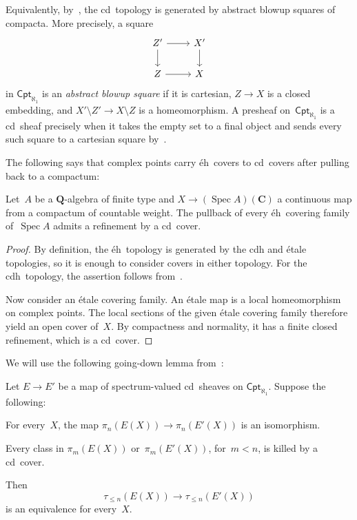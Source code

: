 \documentclass[11pt,a4paper]{amsart}
\numberwithin{equation}{section}
\theoremstyle{plain}
\theoremstyle{definition}
\theoremstyle{remark}
\newcommand{\QQ}{\mathbf{Q}}
\newcommand{\CC}{\mathbf{C}}
\newcommand{\Spec}{\operatorname{Spec}}
\newcommand{\Cat}[1]{\mathsf{#1}}
\begin{document}
Equivalently, by~\cite[Lemma~3.10]{k-ros-1},
the cd~topology is generated
by abstract blowup squares
of compacta.
More precisely, a square
\begin{equation*}
  \begin{tikzcd}
    Z'\ar[d]\ar[r]&
    X'\ar[d]\\
    Z\ar[r]&
    X
  \end{tikzcd}
\end{equation*}
in \(\Cat{Cpt}_{\aleph_1}\)
is an \emph{abstract blowup square} if it is cartesian,
\(Z\to X\) is a closed embedding, and
\(X'\setminus Z'\to X\setminus Z\) is a homeomorphism.
A presheaf on~\(\Cat{Cpt}_{\aleph_1}\)
is a cd~sheaf precisely
when it takes the empty set to a final object
and sends every such square to a cartesian square
by~\cite[Theorem~3.9]{k-ros-1}.

The following says that complex points carry éh~covers
to cd~covers
after pulling back to a compactum:

\begin{lemma}\label{covers}
  Let~\(A\) be a \(\QQ\)-algebra of finite type
  and \(X\to(\Spec A)(\CC)\) a continuous map
  from a compactum of countable weight.
  The pullback of every éh~covering family of~\(\Spec A\)
  admits a refinement
  by a cd~cover.
\end{lemma}

\begin{proof}
  By definition,
  the éh~topology is generated by the cdh and étale topologies,
  so it is enough to consider covers in either topology.
  For the cdh~topology,
  the assertion follows from~\cite[Theorem~4.4]{k-ros-1}.

  Now consider an étale covering family.
  An étale map is a local homeomorphism on complex points.
  The local sections of the given étale covering family
  therefore yield an open cover of~\(X\).
  By compactness and normality,
  it has a finite closed refinement,
  which is a cd~cover.
\end{proof}

We will use the following going-down lemma
from~\cite[Proposition~8.5]{k-ros-1}:

\begin{lemma}\label{going-down}
  Let \(E\to E'\) be a map of spectrum-valued cd~sheaves
  on \(\Cat{Cpt}_{\aleph_1}\).
  Suppose the following:
  \begin{conenum}
    \item\label{i:edge}
      For every~\(X\),
      the map
      \(\pi_{n}(E(X))\to\pi_{n}(E'(X))\) is an isomorphism.
    \item\label{i:triv}
      Every class in
      \(\pi_{m}(E(X))\) or~\(\pi_{m}(E'(X))\), for~\(m<n\),
      is killed by a cd~cover.
  \end{conenum}
  Then
  \begin{equation*}
    \tau_{\leq n}(E(X))\to\tau_{\leq n}(E'(X))
  \end{equation*}
  is an equivalence for every~\(X\).
\end{lemma}
\end{document}
